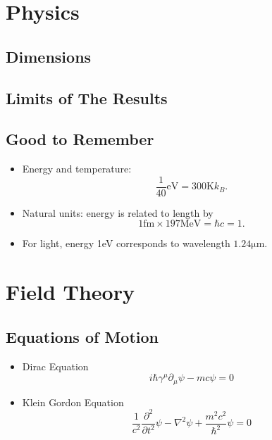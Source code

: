\documentclass{sciposter}
\begin{document}
\begin{multicols}{3}


\section{Physics}

\subsection{Dimensions}



\subsection{Limits of The Results}


\subsection{Good to Remember}

\begin{itemize}
\item Energy and temperature: \begin{equation}
\frac{1}{40}\mathrm{eV} = 300\mathrm{K} k_B .
\end{equation}
\item Natural units: energy is related to length by
\begin{equation}
1\mathrm{fm}\times 197\mathrm{MeV}=\hbar c = 1.
\end{equation}
\item For light, energy 1eV corresponds to wavelength $1.24\mathrm{\mu m}$.
\end{itemize}





\section{Field Theory}


\subsection{Equations of Motion}

\begin{itemize}
\item Dirac Equation
\begin{equation}
i\hbar \gamma^\mu \partial_\mu \psi - m c \psi = 0
\end{equation}
\item Klein Gordon Equation
\begin{equation}
\frac {1}{c^2} \frac{\partial^2}{\partial t^2} \psi - \nabla^2 \psi + \frac {m^2 c^2}{\hbar^2} \psi = 0
\end{equation}
\end{itemize}






\end{multicols}
\end{document}
